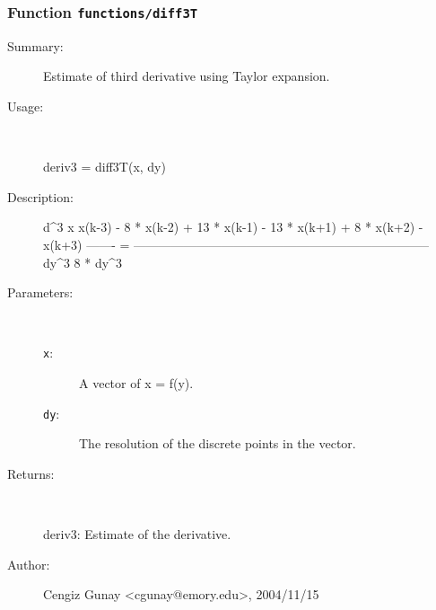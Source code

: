 \subsubsection[Function \texttt{diff3T}]{Function \texttt{functions/diff3T}}%
%
\label{ref_functions__diff3T}%
\hypertarget{ref_functions__diff3T}{}%
\begin{description}
\item[Summary:]Estimate of third derivative using Taylor expansion.
%
\item[Usage:]~%
\begin{lyxcode}%
deriv3 = diff3T(x, dy)
%
\end{lyxcode}%
%
\item[Description:]%
d\textasciicircum{}3 x     x(k-3) - 8 * x(k-2) + 13 * x(k-1) - 13 * x(k+1) + 8 * x(k+2) - x(k+3)
  ------- = -----------------------------------------------------------------------
   dy\textasciicircum{}3			        8 * dy\textasciicircum{}3
\item[Parameters:]~
\begin{description}%
\item[\texttt{x}:]
 A vector of x = f(y).
\item[\texttt{dy}:]
 The resolution of the discrete points in the vector.
\end{description}%
%
\item[Returns:
]~

 	deriv3: Estimate of the derivative.
%
%
%
\item[Author:]%
Cengiz Gunay <cgunay@emory.edu>, 2004/11/15
%
\end{description}
\methodline%
